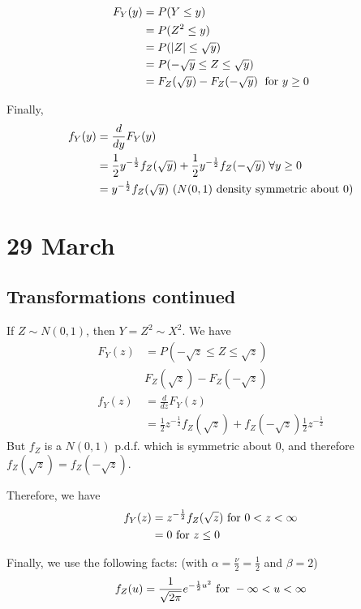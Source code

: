 \documentclass[12pt]{article}
\begin{document}
\begin{align*}
    F_Y (y) &= P(Y \leq y) \\
        &= P(Z^2 \leq y) \\
        &= P(|Z| \leq \sqrt{y}) \\
        &= P(-\sqrt{y} \leq Z \leq \sqrt{y}) \\
        &= F_Z (\sqrt{y}) - F_Z (-\sqrt{y}) \; \textnormal{ for } y \geq 0
\end{align*}

Finally,
\begin{align*}
    f_Y (y) &= \frac{d}{dy} F_Y (y) \\
        &= \frac{1}{2} y^{-\frac{1}{2}} f_Z (\sqrt{y}) + \frac{1}{2} y^{-\frac{1}{2}} f_Z (-\sqrt{y}) \; \forall y \geq 0 \\
        &=y^{-\frac{1}{2}}  f_Z (\sqrt{y}) \textnormal{ ($N(0,1)$ density symmetric about 0)}
\end{align*}

\section{29 March}
\subsection{Transformations continued}
If $Z \sim N(0,1)$, then $Y = Z^2 \sim X^2$. We have
\begin{align*}
    F_Y (z) &= P(-\sqrt{z} \leq Z \leq \sqrt{z}) \\
        & F_Z (\sqrt{z}) - F_Z (-\sqrt{z}) \\
    f_Y (z) &= \frac{d}{dz} F_Y (z) \\
        &= \frac{1}{2} z^{-\frac{1}{2}} f_Z (\sqrt{z}) + f_Z (-\sqrt{z}) \frac{1}{2} z^{-\frac{1}{2}}
\end{align*}
But $f_Z$ is a $N(0,1)$ p.d.f. which is symmetric about 0, and therefore $f_Z (\sqrt{z}) = f_Z (-\sqrt{z})$.

Therefore, we have
\begin{align*}
    f_Y (z) &= z^{-\frac{1}{2}} f_Z (\sqrt{z}) \textnormal{ for } 0 < z < \infty \\
        &= 0 \textnormal{ for } z \leq 0
\end{align*}

Finally, we use the following facts: (with $\alpha = \frac{\nu}{2} = \frac{1}{2}$ and $\beta = 2$)
\[
    f_Z (u) = \frac{1}{\sqrt{2\pi}} e^{-\frac{1}{2} u^2} \textnormal{ for } -\infty < u < \infty
\]
\end{document}
